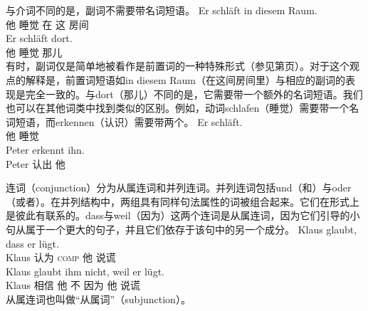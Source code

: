 \largerpage
与介词不同的是，副词不需要带名词短语。
\eal
\ex
\gll Er schläft in diesem Raum.\\
	 他 睡觉 在 这 房间\\
\ex
\gll Er schläft dort.\\
	 他 睡觉 那儿\\
\zl
有时，副词仅是简单地被看作是前置词的一种特殊形式（参见第\pageref{Seite-Adverbien-PP}页）。对于这个观点的解释是，前置词短语如in diesem Raum（在这间房间里）与相应的副词的表现是完全一致的。与dort（那儿）不同的是，它需要带一个额外的名词短语。我们也可以在其他词类中找到类似的区别。例如，动词schlafen（睡觉）需要带一个名词短语，而erkennen（认识）需要带两个。
\eal
\ex 
\gll Er schläft.\\
     他 睡觉\\
\ex 
\gll Peter erkennt ihn.\\
     Peter 认出 他\\
\zl

连词（conjunction）分为从属连词和并列连词。并列连词包括und（和）与oder（或者）。在并列结构中，两组具有同样句法属性的词被组合起来。它们在形式上是彼此有联系的。dass与weil（因为）这两个连词是从属连词，因为它们引导的小句从属于一个更大的句子，并且它们依存于该句中的另一个成分。
\eal
\ex 
\gll Klaus glaubt, dass er lügt.\\
	 Klaus 认为 \textsc{comp} 他 说谎\\
\ex 
\gll Klaus glaubt ihm nicht, weil er lügt.\\
	 Klaus 相信 他 不 因为 他 说谎\\
\zl
从属连词也叫做“从属词”（subjunction）。

